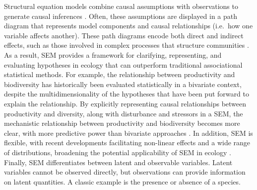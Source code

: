 Structural equation models combine causal assumptions with observations
to generate causal inferences \citep{Pearl2000}. Often, these assumptions are
displayed in a path diagram that represents model components and causal
relationships (i.e.~how one variable affects another). These path
diagrams encode both direct and indirect effects, such as those involved
in complex processes that structure communities \citep{clough2012, Alsterberg2013}.
As a result, SEM provides a framework for clarifying,
representing, and evaluating hypotheses in ecology that can outperform
traditional associational statistical methods. For example, the
relationship between productivity and biodiversity has historically been
evaluated statistically in a bivariate context, despite the
multidimensionality of the hypotheses that have been put forward to
explain the relationship. By explicitly representing causal
relationships between productivity and diversity, along with disturbance
and stressors in a SEM, the mechanistic relationship between
productivity and biodiversity becomes more clear, with more predictive
power than bivariate approaches \citep{Grace2014}. In addition, SEM is
flexible, with recent developments facilitating non-linear effects and a
wide range of distributions, broadening the potential applicability of
SEM in ecology \citep{Lee2007b}. Finally, SEM differentiates between latent
and observable variables. Latent variables cannot be observed directly,
but observations can provide information on latent quantities. A classic
example is the presence or absence of a species.

